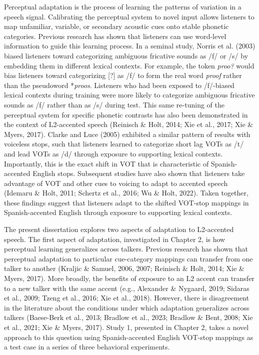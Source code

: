 \documentclass[
  12pt,
  twoside]{article}
\begin{document}
Perceptual adaptation is the process of learning the patterns of variation in a speech signal.
Calibrating the perceptual system to novel input allows listeners to map unfamiliar, variable, or secondary acoustic cues onto stable phonetic categories.
Previous research has shown that listeners can use word-level information to guide this learning process.
In a seminal study, Norris et al. (2003) biased listeners toward categorizing ambiguous fricative sounds as /f/ or /s/ by embedding them in different lexical contexts.
For example, the token \emph{proo?} would bias listeners toward categorizing {[}?{]} as /f/ to form the real word \emph{proof} rather than the pseudoword *\emph{proos}.
Listeners who had been exposed to /f/-biased lexical contexts during training were more likely to categorize ambiguous fricative sounds as /f/ rather than as /s/ during test.
This same re-tuning of the perceptual system for specific phonetic contrasts has also been demonstrated in the context of L2-accented speech (Reinisch \& Holt, 2014; Xie et al., 2017; Xie \& Myers, 2017).
Clarke and Luce (2005) exhibited a similar pattern of results with voiceless stops, such that listeners learned to categorize short lag VOTs as /t/ and lead VOTs as /d/ through exposure to supporting lexical contexts.
Importantly, this is the exact shift in VOT that is characteristic of Spanish-accented English stops.
Subsequent studies have also shown that listeners take advantage of VOT and other cues to voicing to adapt to accented speech (Idemaru \& Holt, 2011; Schertz et al., 2016; Wu \& Holt, 2022).
Taken together, these findings suggest that listeners adapt to the shifted VOT-stop mappings in Spanish-accented English through exposure to supporting lexical contexts.

The present dissertation explores two aspects of adaptation to L2-accented speech.
The first aspect of adaptation, investigated in Chapter 2, is how perceptual learning generalizes across talkers.
Previous research has shown that perceptual adaptation to particular cue-category mappings can transfer from one talker to another (Kraljic \& Samuel, 2006, 2007; Reinisch \& Holt, 2014; Xie \& Myers, 2017).
More broadly, the benefits of exposure to an L2 accent can transfer to a new talker with the same accent (e.g., Alexander \& Nygaard, 2019; Sidaras et al., 2009; Tzeng et al., 2016; Xie et al., 2018).
However, there is disagreement in the literature about the conditions under which adaptation generalizes across talkers (Baese-Berk et al., 2013; Bradlow et al., 2023; Bradlow \& Bent, 2008; Xie et al., 2021; Xie \& Myers, 2017).
Study 1, presented in Chapter 2, takes a novel approach to this question using Spanish-accented English VOT-stop mappings as a test case in a series of three behavioral experiments.
\end{document}
